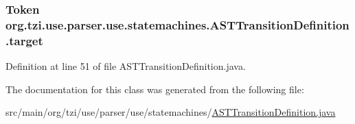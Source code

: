 \hypertarget{classorg_1_1tzi_1_1use_1_1parser_1_1use_1_1statemachines_1_1_a_s_t_transition_definition_a24e0ee5ecc1045178eaea544c570ff7f}{
\subsubsection[{target}]{\setlength{\rightskip}{0pt plus 5cm}Token org.\-tzi.\-use.\-parser.\-use.\-statemachines.\-A\-S\-T\-Transition\-Definition.\-target\hspace{0.3cm}{\ttfamily [protected]}}}\label{classorg_1_1tzi_1_1use_1_1parser_1_1use_1_1statemachines_1_1_a_s_t_transition_definition_a24e0ee5ecc1045178eaea544c570ff7f}


Definition at line 51 of file A\-S\-T\-Transition\-Definition.\-java.



The documentation for this class was generated from the following file\-:\begin{DoxyCompactItemize}
\item 
src/main/org/tzi/use/parser/use/statemachines/\hyperlink{_a_s_t_transition_definition_8java}{A\-S\-T\-Transition\-Definition.\-java}\end{DoxyCompactItemize}
